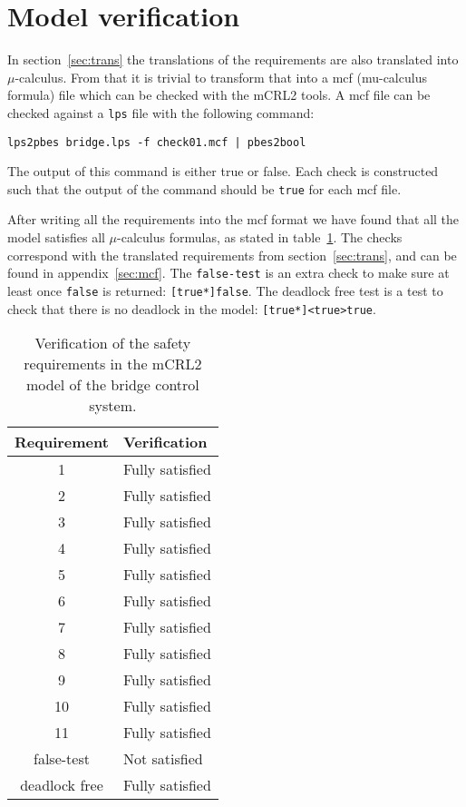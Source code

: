 \section{Model verification}
\label{sec:check}

In section~\ref{sec:trans} the translations of the requirements are also
translated into $\mu$-calculus. From that it is trivial to transform that into
a mcf (mu-calculus formula) file which can be checked with the mCRL2 tools. A
mcf file can be checked against a \texttt{lps} file with the following command:

\begin{verbatim}
lps2pbes bridge.lps -f check01.mcf | pbes2bool
\end{verbatim}

The output of this command is either true or false. Each check is constructed such
that the output of the command should be \texttt{true} for each mcf file.

After writing all the requirements into the mcf format we have found that all
the model satisfies all $\mu$-calculus formulas, as stated in
table~\ref{tab:checks}. The checks correspond with the translated requirements
from section~\ref{sec:trans}, and can be found in appendix~\ref{sec:mcf}. The
\texttt{false-test} is an extra check to make sure at least once \texttt{false}
is returned: \texttt{[true*]false}. The deadlock free test is a test to check
that there is no deadlock in the model: \texttt{[true*]<true>true}.

\begin{table}[htb]%
\centering
\begin{tabular}{|c|l|}
	\hline
	\textbf{Requirement} & \textbf{Verification}\\
	\hline
	1 & Fully satisfied\\
	2 & Fully satisfied\\
	3 & Fully satisfied\\
	4 & Fully satisfied\\
	5 & Fully satisfied\\
	6 & Fully satisfied\\
	7 & Fully satisfied\\
	8 & Fully satisfied\\
	9 & Fully satisfied\\
	10 & Fully satisfied\\
	11 & Fully satisfied\\
	\hline
	false-test & Not satisfied\\
	deadlock free & Fully satisfied\\
	\hline
\end{tabular}
\caption{Verification of the safety requirements in the mCRL2 model of the bridge control system.}
\label{tab:checks}
\end{table}


